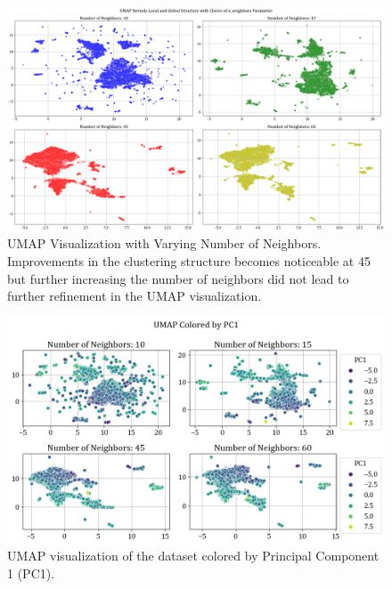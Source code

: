 \documentclass[11pt,a4paper]{article}
\begin{document}
\begin{figure}[H]
	\centering
	\includegraphics[scale=0.2]{images/umap_n_neighbors.png}
	\caption{UMAP Visualization with Varying Number of Neighbors. Improvements in the clustering structure becomes noticeable at 45 but further increasing the number of neighbors did not lead to further refinement in the UMAP visualization.}
	\label{fig:umap_n_neigh}
\end{figure}

\begin{figure}[H]
	\centering
	\includegraphics[scale=0.5]{images/umap_pc1.png}
	\caption{UMAP visualization of the dataset colored by Principal Component 1 (PC1).}
	\label{fig:umap_pc1}
\end{figure}
\end{document}
